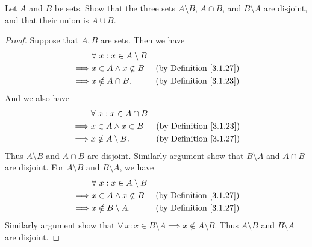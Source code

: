 \begin{exercise}\label{ex 3.1.10}
Let \(A\) and \(B\) be sets.
Show that the three sets \(A \setminus B\), \(A \cap B\), and \(B \setminus A\) are disjoint, and that their union is \(A \cup B\).
\end{exercise}

\begin{proof}
Suppose that \(A, B\) are sets.
Then we have
\begin{align*}
& \forall\ x : x \in A \setminus B \\
\implies & x \in A \land x \notin B & \text{(by Definition \ref{3.1.27})} \\
\implies & x \notin A \cap B. & \text{(by Definition \ref{3.1.23})}
\end{align*}
And we also have
\begin{align*}
& \forall\ x : x \in A \cap B \\
\implies & x \in A \land x \in B & \text{(by Definition \ref{3.1.23})} \\
\implies & x \notin A \setminus B. & \text{(by Definition \ref{3.1.27})}
\end{align*}
Thus \(A \setminus B\) and \(A \cap B\) are disjoint.
Similarly argument show that \(B \setminus A\) and \(A \cap B\) are disjoint.
For \(A \setminus B\) and \(B \setminus A\), we have
\begin{align*}
& \forall\ x : x \in A \setminus B \\
\implies & x \in A \land x \notin B & \text{(by Definition \ref{3.1.27})} \\
\implies & x \notin B \setminus A. & \text{(by Definition \ref{3.1.27})}
\end{align*}
Similarly argument show that \(\forall\ x : x \in B \setminus A \implies x \notin A \setminus B\).
Thus \(A \setminus B\) and \(B \setminus A\) are disjoint.


\end{proof}
